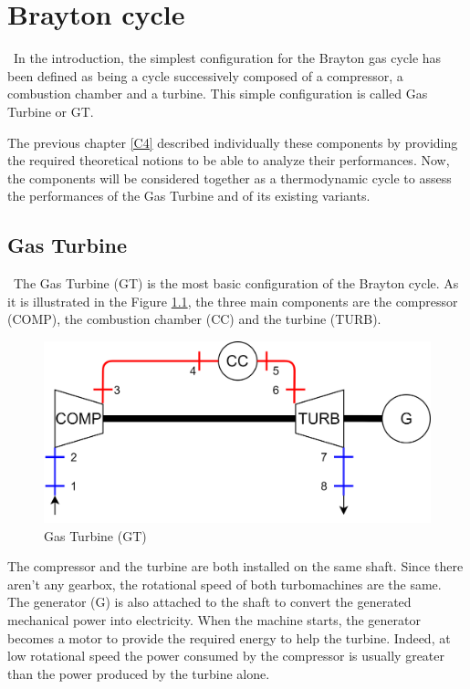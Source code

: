 \graphicspath{{Chapitre_5/Images/}}
\chapter{Brayton cycle}\label{C5}
\quad\, In the introduction, the simplest configuration for the Brayton gas cycle has been defined as being a cycle successively composed of a compressor, a combustion chamber and a turbine. This simple configuration is called Gas Turbine or GT. 

The previous chapter \ref{C4} described individually these components by providing the required theoretical notions to be able to analyze their performances. Now, the components will be considered together as a thermodynamic cycle to assess the performances of the Gas Turbine and of its existing variants.

\section{Gas Turbine}
\quad\, The Gas Turbine (GT) is the most basic configuration of the Brayton cycle. As it is illustrated in the Figure \ref{fig:C5_BraytonGT}, the three main components are the compressor (COMP), the combustion chamber (CC) and the turbine (TURB).

\begin{figure}[h]
\centering
\includegraphics[scale=0.15] {GT}
\caption{Gas Turbine (GT)}
\label{fig:C5_BraytonGT}
\end{figure}

The compressor and the turbine are both installed on the same shaft. Since there aren't any gearbox, the rotational speed of both turbomachines are the same. The generator (G) is also attached to the shaft to convert the generated mechanical power into electricity. 
When the machine starts, the generator becomes a motor to provide the required energy to help the turbine. Indeed, at low rotational speed the power consumed by the compressor is usually greater than the power produced by the turbine alone. 



